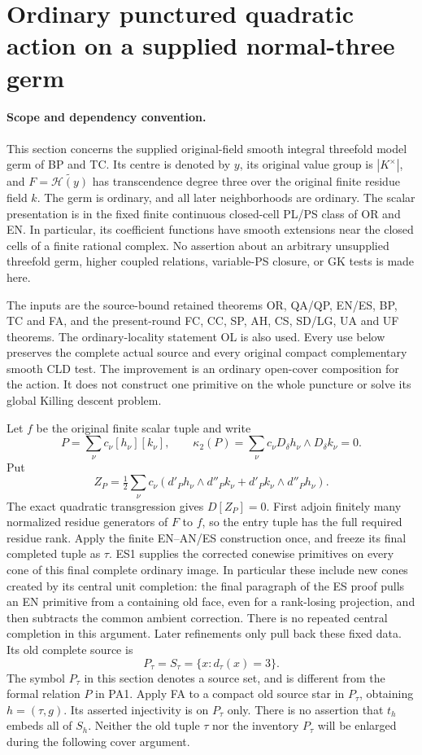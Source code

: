 \section{Ordinary punctured quadratic action on a supplied normal-three germ}
\label{sec:r13-punctured-quadratic-action}

\paragraph{Scope and dependency convention.}
This section concerns the supplied original-field smooth integral
threefold model germ of BP and TC.  Its centre is denoted by $y$,
its original value group is $|K^\times|$, and
$F=\widetilde{\mathcal H(y)}$ has transcendence degree three over
the original finite residue field $k$.  The germ is ordinary, and
all later neighborhoods are ordinary.  The scalar presentation is
in the fixed finite continuous closed-cell PL/PS class of OR and
EN.  In particular, its coefficient functions have smooth
extensions near the closed cells of a finite rational complex.
No assertion about an arbitrary unsupplied threefold germ, higher
coupled relations, variable-PS closure, or GK tests is made here.

The inputs are the source-bound retained theorems OR, QA/QP,
EN/ES, BP, TC and FA, and the present-round FC, CC, SP, AH,
CS, SD/LG, UA and UF theorems.  The ordinary-locality statement
OL is also used.  Every use below preserves the complete actual
source and every original compact complementary smooth CLD test.
The improvement is an ordinary open-cover composition for the
action.  It does not construct one primitive on the whole
puncture or solve its global Killing descent problem.

Let $f$ be the original finite scalar tuple and write
\[
 P=\sum_\nu c_\nu[h_\nu][k_\nu],\qquad
 \kappa_2(P)=\sum_\nu c_\nu
             D_\delta h_\nu\wedge D_\delta k_\nu=0.
 \tag{PA1}
\]
Put
\[
 Z_P=\tfrac12\sum_\nu c_\nu
   (d'_Ph_\nu\wedge d''_Pk_\nu+
                         d'_Pk_\nu\wedge d''_Ph_\nu).
 \tag{PA2}
\]
The exact quadratic transgression gives $D[Z_P]=0$.  First adjoin
finitely many normalized residue generators of $F$ to $f$, so
the entry tuple has the full required residue rank.  Apply the
finite EN--AN/ES construction once, and freeze its final completed
tuple as $\tau$.  ES1 supplies the corrected conewise primitives
on every cone of this final complete ordinary image.  In
particular these include new cones created by its central unit
completion: the final paragraph of the ES proof pulls an EN
primitive from a containing old face, even for a rank-losing
projection, and then subtracts the common ambient correction.
There is no repeated central completion in this argument.
Later refinements only pull back these fixed data.  Its old
complete source is
\[
                  P_\tau=S_\tau=\{x:d_\tau(x)=3\}.
 \tag{PA3}
\]
The symbol $P_\tau$ in this section denotes a source set, and
is different from the formal relation $P$ in PA1.
Apply FA to a compact old source star in $P_\tau$, obtaining
$h=(\tau,g)$.  Its asserted injectivity is on $P_\tau$ only.
There is no assertion that $t_h$ embeds all of $S_h$.
Neither the old tuple $\tau$ nor the inventory $P_\tau$ will
be enlarged during the following cover argument.

